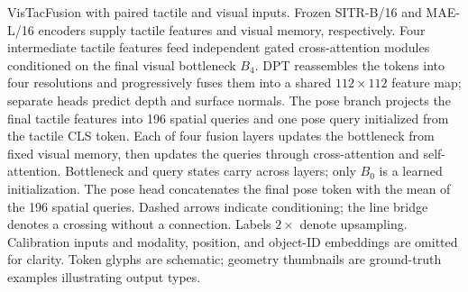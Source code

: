VisTacFusion with paired tactile and visual inputs.
Frozen SITR-B/16 and MAE-L/16 encoders supply tactile features and visual
memory, respectively. Four intermediate tactile features feed independent
gated cross-attention modules conditioned on the final visual bottleneck
$B_4$. DPT reassembles the tokens into four resolutions and progressively
fuses them into a shared $112\times112$ feature map; separate heads predict
depth and surface normals. The pose branch projects the final tactile
features into 196 spatial queries and one pose query initialized from the
tactile CLS token. Each of four fusion layers updates the bottleneck from
fixed visual memory, then updates the queries through cross-attention and
self-attention. Bottleneck and query states carry across layers; only $B_0$
is a learned initialization. The pose head concatenates the final pose token
with the mean of the 196 spatial queries. Dashed arrows indicate conditioning;
the line bridge denotes a crossing without a connection. Labels $2\times$
denote upsampling. Calibration inputs and modality, position, and object-ID
embeddings are omitted for clarity. Token glyphs are schematic; geometry
thumbnails are ground-truth examples illustrating output types.
